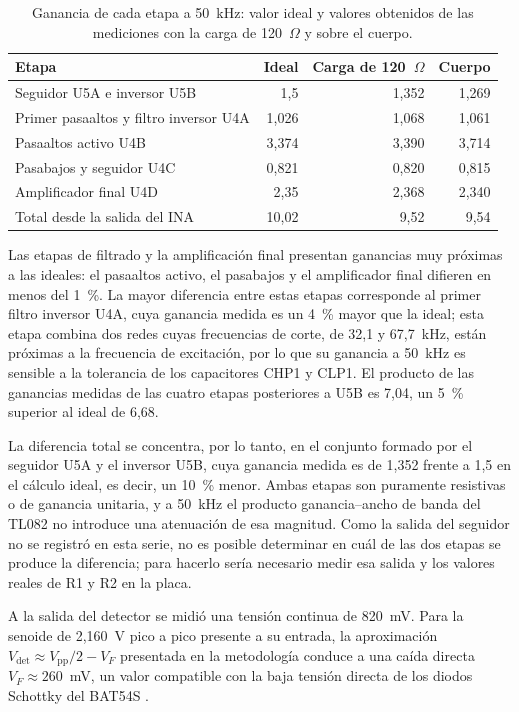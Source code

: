 \documentclass[12pt,a4paper]{article}
\begin{document}
\begin{table}[htbp]
    \centering
    \caption{Ganancia de cada etapa a 50~kHz: valor ideal y valores obtenidos de las mediciones con
    la carga de 120~$\Omega$ y sobre el cuerpo.}
    \label{tab:ganancias_comparadas}
    \begin{tabular}{lrrr}
        \hline
        Etapa & Ideal & Carga de 120~$\Omega$ & Cuerpo \\
        \hline
        Seguidor U5A e inversor U5B & 1,5 & 1,352 & 1,269 \\
        Primer pasaaltos y filtro inversor U4A & 1,026 & 1,068 & 1,061 \\
        Pasaaltos activo U4B & 3,374 & 3,390 & 3,714 \\
        Pasabajos y seguidor U4C & 0,821 & 0,820 & 0,815 \\
        Amplificador final U4D & 2,35 & 2,368 & 2,340 \\
        \hline
        Total desde la salida del INA & 10,02 & 9,52 & 9,54 \\
        \hline
    \end{tabular}
\end{table}

Las etapas de filtrado y la amplificación final presentan ganancias muy próximas a las ideales:
el pasaaltos activo, el pasabajos y el amplificador final difieren en menos del 1~\%. La mayor
diferencia entre estas etapas corresponde al primer filtro inversor U4A, cuya ganancia medida es
un 4~\% mayor que la ideal; esta etapa combina dos redes cuyas frecuencias de corte, de 32,1 y
67,7~kHz, están próximas a la frecuencia de excitación, por lo que su ganancia a 50~kHz es
sensible a la tolerancia de los capacitores CHP1 y CLP1. El producto de las ganancias medidas
de las cuatro etapas posteriores a U5B es 7,04, un 5~\% superior al ideal de 6,68.

La diferencia total se concentra, por lo tanto, en el conjunto formado por el seguidor U5A y el
inversor U5B, cuya ganancia medida es de 1,352 frente a 1,5 en el cálculo ideal, es decir, un
10~\% menor. Ambas etapas son puramente resistivas o de ganancia unitaria, y a 50~kHz el producto
ganancia--ancho de banda del TL082 no introduce una atenuación de esa magnitud. Como la salida
del seguidor no se registró en esta serie, no es posible determinar en cuál de las dos etapas se
produce la diferencia; para hacerlo sería necesario medir esa salida y los valores reales de R1
y R2 en la placa.

A la salida del detector se midió una tensión continua de 820~mV. Para la senoide de 2,160~V
pico a pico presente a su entrada, la aproximación $V_{\mathrm{det}}\approx V_{\mathrm{pp}}/2-V_F$
presentada en la metodología conduce a una caída directa $V_F\approx260$~mV, un valor compatible
con la baja tensión directa de los diodos Schottky del BAT54S \cite{nexperia_bat54s}.
\end{document}
